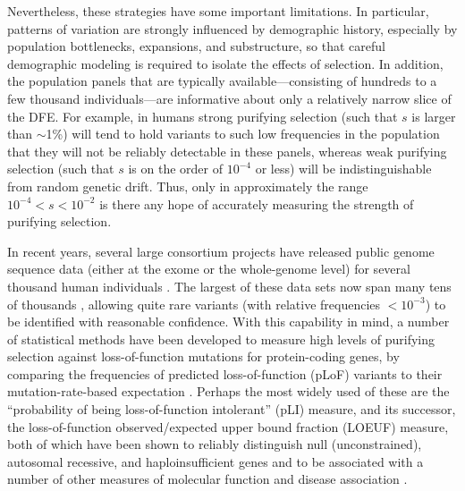 \documentclass[11pt]{article}
\begin{document}
Nevertheless, these strategies have some important limitations.  In particular, patterns of variation are strongly influenced by demographic history, especially by population bottlenecks, expansions, and substructure, so that careful demographic modeling is required to isolate the effects of selection.  In addition, the population panels that are typically available---consisting of hundreds to a few thousand individuals---are informative about only a relatively narrow slice of the DFE.  For example, in humans strong purifying selection (such that $s$ is larger than $\sim$1\%) will tend to hold variants to such low frequencies in the population that they will not be reliably detectable in these panels, whereas weak purifying selection (such that $s$ is on the order of $10^{-4}$ or less) will be indistinguishable from random genetic drift.  Thus, only in approximately the range $10^{-4} < s < 10^{-2}$  is there any hope of accurately measuring the strength of purifying selection.

In recent years, several large consortium projects have released public genome sequence data (either at the exome or the whole-genome level) for several thousand human individuals \cite{FUETAL13,1KGCONS15,LEKETAL16,KARCETAL20}.  The largest of these data sets now span many tens of thousands \cite{LEKETAL16,KARCETAL20}, allowing quite rare variants (with relative frequencies  $<10^{-3}$) to be identified with reasonable confidence.  With this capability in mind, a number of statistical methods have been developed to measure high levels of purifying selection against loss-of-function mutations for protein-coding genes, by comparing the frequencies of predicted loss-of-function (pLoF) variants to their mutation-rate-based expectation \cite{PETRETAL13,LEKETAL16,KARCETAL20,CASSETAL17,HAVRETAL19}.
Perhaps the most widely used of these are the ``probability of being loss-of-function intolerant'' (pLI) measure, and its successor, the loss-of-function observed/expected upper bound fraction (LOEUF) measure, both of which have been shown to reliably distinguish null (unconstrained), autosomal recessive, and haploinsufficient genes and to be associated with a number of other measures of molecular function and disease association \cite{LEKETAL16,KARCETAL20}.
\end{document}
